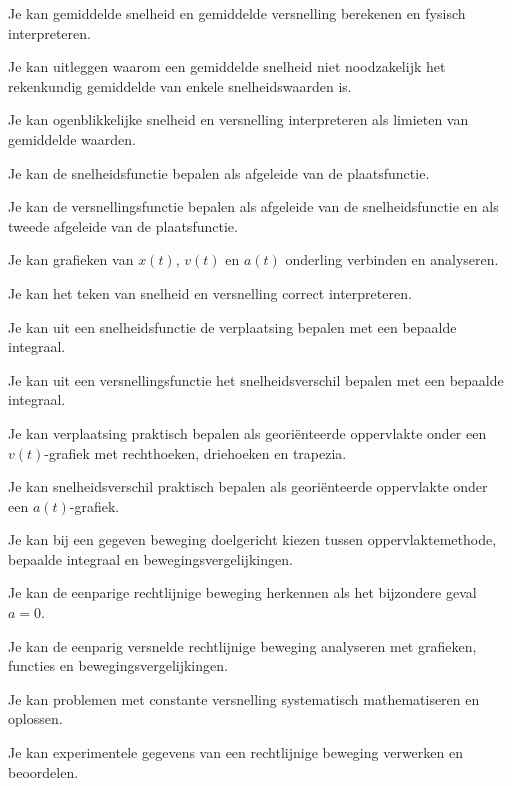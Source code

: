 \documentclass{ximera}
\begin{document}
\begin{leerdoelen}

 \item Je kan gemiddelde snelheid en gemiddelde versnelling berekenen en fysisch interpreteren.

 \item Je kan uitleggen waarom een gemiddelde snelheid niet noodzakelijk het rekenkundig gemiddelde van enkele snelheidswaarden is.

 \item Je kan ogenblikkelijke snelheid en versnelling interpreteren als limieten van gemiddelde waarden.

 \item Je kan de snelheidsfunctie bepalen als afgeleide van de plaatsfunctie.

 \item Je kan de versnellingsfunctie bepalen als afgeleide van de snelheidsfunctie en als tweede afgeleide van de plaatsfunctie.

 \item Je kan grafieken van $x(t)$, $v(t)$ en $a(t)$ onderling verbinden en analyseren.

 \item Je kan het teken van snelheid en versnelling correct interpreteren.

 \item Je kan uit een snelheidsfunctie de verplaatsing bepalen met een bepaalde integraal.

 \item Je kan uit een versnellingsfunctie het snelheidsverschil bepalen met een bepaalde integraal.

 \item Je kan verplaatsing praktisch bepalen als georiënteerde oppervlakte onder een $v(t)$-grafiek met rechthoeken, driehoeken en trapezia.

 \item Je kan snelheidsverschil praktisch bepalen als georiënteerde oppervlakte onder een $a(t)$-grafiek.

 \item Je kan bij een gegeven beweging doelgericht kiezen tussen oppervlaktemethode, bepaalde integraal en bewegingsvergelijkingen.

 \item Je kan de eenparige rechtlijnige beweging herkennen als het bijzondere geval $a=0$.

 \item Je kan de eenparig versnelde rechtlijnige beweging analyseren met grafieken, functies en bewegingsvergelijkingen.

 \item Je kan problemen met constante versnelling systematisch mathematiseren en oplossen.

 \item Je kan experimentele gegevens van een rechtlijnige beweging verwerken en beoordelen.

\end{leerdoelen}
\end{document}

